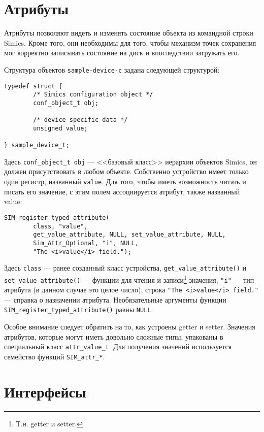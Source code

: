 \section{Атрибуты}

Атрибуты позволяют видеть и изменять состояние объекта из командной строки Simics. Кроме того, они необходимы для того, чтобы механизм точек сохранения мог корректно записывать состояние на диск и впоследствии загружать его.

Структура объектов \texttt{sample-device-c} задана следующей структурой:
\begin{lstlisting}
typedef struct {
        /* Simics configuration object */
        conf_object_t obj;

        /* device specific data */
        unsigned value;

} sample_device_t;
\end{lstlisting}

Здесь \texttt{conf_object_t obj} --- <<базовый класс>> иерархии объектов Simics, он должен присутствовать в любом объекте. Собственно устройство имеет только один регистр, названный \texttt{value}. Для того, чтобы иметь возможность читать и писать его значение, с этим полем ассоциируется атрибут, также названный value:

\begin{lstlisting}
SIM_register_typed_attribute(
        class, "value",
        get_value_attribute, NULL, set_value_attribute, NULL,
        Sim_Attr_Optional, "i", NULL,
        "The <i>value</i> field.");
\end{lstlisting}

Здесь \texttt{class} --- ранее созданный класс устройства, \texttt{get_value_attribute()} и \texttt{set_value_attribute()} --- функции для чтения и записи\footnote{Т.н. getter и setter.} значения, \texttt{"i"} --- тип атрибута (в данном случае это целое число), строка \texttt{"The <i>value</i> field."} --- справка о назначении атрибута. Необязательные аргументы функции \texttt{SIM_register_typed_attribute()} равны \texttt{NULL}.

Особое внимание следует обратить на то, как устроены getter и setter. Значения атрибутов, которые могут иметь довольно сложные типы, упакованы в специальный класс \texttt{attr_value_t}. Для получения значений используется семейство функций \texttt{SIM_attr_*}.

\section{Интерфейсы}

